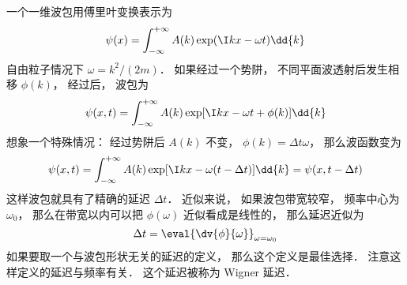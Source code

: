 
一个一维波包用傅里叶变换表示为
\begin{equation}
\psi(x) = \int_{-\infty}^{+\infty} A(k) \exp(\I kx - \omega t) \dd{k}
\end{equation}
自由粒子情况下 $\omega = k^2/(2m)$． 如果经过一个势阱， 不同平面波透射后发生相移 $\phi(k)$， 经过后， 波包为
\begin{equation}
\psi(x, t) = \int_{-\infty}^{+\infty} A(k) \exp[\I kx - \omega t + \phi(k)] \dd{k}
\end{equation}
想象一个特殊情况： 经过势阱后 $A(k)$ 不变， $\phi(k) = \Delta t \omega$， 那么波函数变为
\begin{equation}
\psi(x, t) = \int_{-\infty}^{+\infty} A(k) \exp[\I kx - \omega (t - \Delta t) ] \dd{k}
= \psi(x, t - \Delta t)
\end{equation}
这样波包就具有了精确的延迟 $\Delta t$． 近似来说， 如果波包带宽较窄， 频率中心为 $\omega_0$， 那么在带宽以内可以把 $\phi(\omega)$ 近似看成是线性的， 那么延迟近似为
\begin{equation}
\Delta t = \eval{\dv{\phi}{\omega}}_{\omega = \omega_0}
\end{equation}
如果要取一个与波包形状无关的延迟的定义， 那么这个定义是最佳选择． 注意这样定义的延迟与频率有关． 这个延迟被称为 Wigner 延迟．
